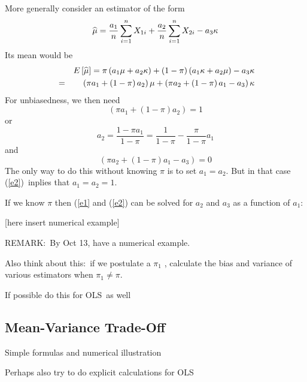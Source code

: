 \documentclass[12pt]{article}
\begin{document}
More generally consider an estimator of the form
\begin{equation}
\widehat{\mu }=\frac{a_{1}}{n}\dsum\limits_{i=1}^{n}X_{1i}+\frac{a_{2}}{n}%
\dsum\limits_{i=1}^{n}X_{2i}-a_{3}\kappa  \label{muhat}
\end{equation}%
Its mean would be
\begin{eqnarray}
&&E\left[ \widehat{\mu }\right] =\pi \left( a_{1}\mu +a_{2}\kappa \right)
+\left( 1-\pi \right) \left( a_{1}\kappa +a_{2}\mu \right) -a_{3}\kappa
\label{e0} \\
&=&\left( \pi a_{1}+\left( 1-\pi \right) a_{2}\right) \mu +\left( \pi
a_{2}+\left( 1-\pi \right) a_{1}-a_{3}\right) \kappa  \notag
\end{eqnarray}%
For unbiasedness, we then need%
\begin{equation}
\left( \pi a_{1}+\left( 1-\pi \right) a_{2}\right) =1  \label{e1}
\end{equation}%
or%
\begin{equation*}
a_{2}=\frac{1-\pi a_{1}}{1-\pi }=\frac{1}{1-\pi }-\frac{\pi }{1-\pi }a_{1}
\end{equation*}%
and%
\begin{equation}
\left( \pi a_{2}+\left( 1-\pi \right) a_{1}-a_{3}\right) =0  \label{e2}
\end{equation}%
The only way to do this without knowing $\pi $ is to set $a_{1}=a_{2}$. But
in that case (\ref{e2})\ inplies that $a_{1}=a_{2}=1$.

If we know $\pi $ then (\ref{e1} and (\ref{e2}) can be solved for $a_{2}$
and $a_{3}$ as a function of $a_{1}$:

\begin{center}
[here insert numerical example]
\end{center}

REMARK:\ By Oct 13, have a numerical example.

Also think about this:\ if we postulate a $\pi _{1}$ , calculate the bias
and variance of various estimators when $\pi _{1}\neq \pi .$

If possible do this for OLS\ as well

\subsection{Mean-Variance Trade-Off}

Simple formulas and numerical illustration

Perhaps also try to do explicit calculations for OLS
\end{document}
